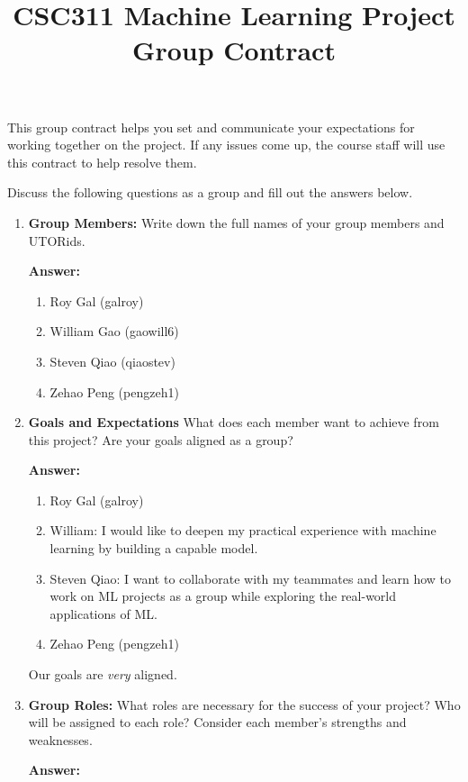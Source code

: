 \documentclass[12pt]{article}
\title{CSC311 Machine Learning Project Group Contract}
\author{}
\date{}
\newenvironment{answer}[1][]{
  \color{blue}\textbf{Answer:}
}{}
\begin{document}
\maketitle

This group contract helps you set and communicate your expectations for working together on the project. If any issues come up, the course staff will use this contract to help resolve them.

Discuss the following questions as a group and fill out the answers below.

\begin{enumerate}
\item {\bf Group Members:} Write down the full names of your group members and UTORids.

\begin{answer}
\begin{enumerate}
  \item Roy Gal (galroy)
  \item William Gao (gaowill6)
  \item Steven Qiao (qiaostev)
  \item Zehao Peng (pengzeh1)
\end{enumerate}
\end{answer}

\item {\bf Goals and Expectations} What does each member want to achieve from this project? Are your goals aligned as a group?

\begin{answer}
\begin{enumerate}
  \item Roy Gal (galroy)
  \item William: I would like to deepen my practical experience with machine learning by building a capable model.
  \item Steven Qiao: I want to collaborate with my teammates and learn how to work on ML projects as a group while exploring the real-world applications of ML. 
  \item Zehao Peng (pengzeh1)
\end{enumerate}
Our goals are \emph{very} aligned.
\end{answer}

\item {\bf Group Roles:} What roles are necessary for the success of your project? Who will be assigned to each role? Consider each member’s strengths and weaknesses.

\begin{answer}


\end{answer}
\end{enumerate}
\end{document}
